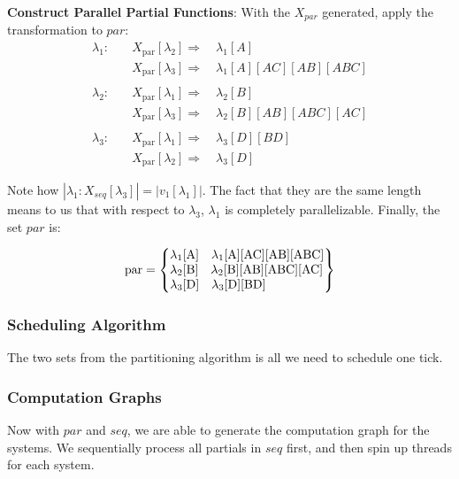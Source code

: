 \textbf{Construct Parallel Partial Functions}: With the $X_{par}$ generated, apply the transformation to $par$:
\begin{align*}
    \lambda_1: \quad & X_{\text{par}}[\lambda_2]  \Rightarrow \quad \lambda_1[A] \\
                     & X_{\text{par}}[\lambda_3]  \Rightarrow \quad \lambda_1[A][AC][AB][ABC] \\ 
    \\[0.3em]
    \lambda_2: \quad & X_{\text{par}}[\lambda_1]  \Rightarrow \quad \lambda_2[B] \\
                     & X_{\text{par}}[\lambda_3]  \Rightarrow \quad \lambda_2[B][AB][ABC][AC] \\
    \\[0.3em]
    \lambda_3: \quad & X_{\text{par}}[\lambda_1]  \Rightarrow \quad \lambda_3[D][BD] \\
                     & X_{\text{par}}[\lambda_2]  \Rightarrow \quad \lambda_3[D]
\end{align*}

Note how $|\lambda_1:X_{seq}[\lambda_3]| = |v_1[\lambda_1]|$. The fact that they are the same length means to us that with respect to $\lambda_3$, $\lambda_1$ is completely parallelizable. Finally, the set $par$ is:

$$
\text{par} = \left\{
\begin{array}{@{}l@{}}
    \lambda_1[\text{A}] \quad \lambda_1[\text{A}][\text{AC}][\text{AB}][\text{ABC}] \\ 
    \lambda_2[\text{B}] \quad \lambda_2[\text{B}][\text{AB}][\text{ABC}][\text{AC}] \\
    \lambda_3[\text{D}] \quad \lambda_3[\text{D}][\text{BD}]
\end{array}
\right\}
$$

\subsubsection{Scheduling Algorithm}
The two sets from the partitioning algorithm is all we need to schedule one tick.


\subsubsection{Computation Graphs}
Now with $par$ and $seq$, we are able to generate the computation graph for the systems. We sequentially process all partials in $seq$ first, and then spin up threads for each system. 

